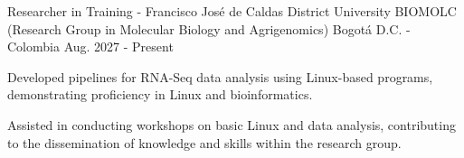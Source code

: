 \begin{cventries}
\cventry
{Researcher in Training - Francisco José de Caldas District University} %
{BIOMOLC (Research Group in Molecular Biology and Agrigenomics)} %
{Bogotá D.C. - Colombia} %
{Aug. 2027 - Present} %
{ %
\begin{cvitems}
\item {Developed pipelines for RNA-Seq data analysis using Linux-based programs, demonstrating proficiency in Linux and bioinformatics.}
\item {Assisted in conducting workshops on basic Linux and data analysis, contributing to the dissemination of knowledge and skills within the research group.}
\end{cvitems}
}
\end{cventries}
